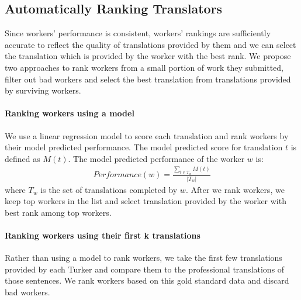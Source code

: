 \documentclass[11pt,letterpaper]{article}
\begin{document}
\subsection{Automatically Ranking Translators}


Since workers' performance is consistent, workers' rankings are sufficiently accurate to reflect the quality of translations provided by them and we can select the translation which is provided by the worker with the best rank. 
We propose two approaches to rank workers from a small portion of work they submitted, filter out bad workers and select the best translation from translations provided by  surviving workers.




\paragraph{Ranking workers using a model}
We use a linear regression model to score each translation and rank workers by their model predicted performance.  
The model predicted score for translation $t$ is defined as $M(t)$. The model predicted performance of the worker $w$ is:
\begin{align*}
Performance(w) = \frac{\sum_{t \in T_{w}} M (t)}{|T_{w}|}
 \end{align*}
 where $T_{w} $ is the set of translations completed by $w$. 
After we rank workers, we keep top workers in the list and select translation provided by the worker with best rank among top workers.

\paragraph{Ranking workers using their first k translations}
Rather than using a model to rank workers, we take the first few translations provided by each Turker  and compare them to the professional translations of those sentences. We rank workers based on this gold standard data and discard bad workers.
\end{document}
